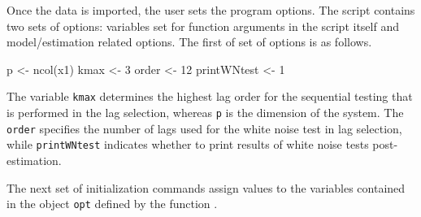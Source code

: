 \documentclass[article]{jss}
\newcommand{\fct}[1]{\code{#1()}}
\begin{document}
Once the data is imported, the user sets the program options. The script contains two sets of options: variables set for function arguments in the script itself and model/estimation related options. 
The first of set of options is as follows. 
% 
\begin{Code}
p               <- ncol(x1) 
kmax            <- 3
order           <- 12
printWNtest     <-  1
\end{Code}

The variable \verb|kmax| determines the highest lag order for the sequential testing that is performed in the lag selection, whereas \verb|p| is the dimension of the system. 
The \verb|order| specifies the number of lags used for the white noise test in lag selection, 
while \verb|printWNtest| indicates whether to print results of white noise tests post-estimation. 

The next set of initialization commands
assign values to the variables contained in the object \verb|opt| defined by the function \fct{FCVARoptions}. 

% 
\end{document}
